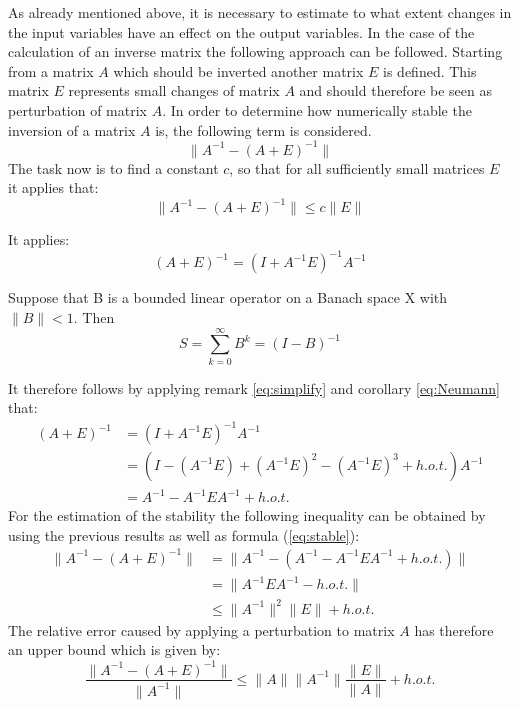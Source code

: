 As already mentioned above, it is necessary to estimate to what extent changes in the input variables have an effect on the output variables. In the case of the calculation of an inverse matrix the following approach can be followed. Starting from a matrix $A$ which should be inverted another matrix $E$ is defined. This matrix $E$ represents small changes of matrix $A$ and should therefore be seen as perturbation of matrix $A$. In order to determine how numerically stable the inversion of a matrix $A$ is, the following term is considered.
\begin{equation}\label{eq:stable}
	\lVert A^{-1} - (A + E)^{-1} \rVert
\end{equation}
The task now is to find a constant $c$, so that for all sufficiently small matrices $E$ it applies that:
\begin{equation}
	\lVert A^{-1} - (A + E)^{-1} \rVert \leq c \lVert E \rVert
\end{equation}
 
\begin{remark}\label{eq:simplify}
	It applies:
	\begin{equation*}
		(A + E)^{-1} = (I + A^{-1}E)^{-1}A^{-1}
	\end{equation*}
\end{remark}

\begin{corollary}\label{eq:Neumann}
	Suppose that B is a bounded linear operator on a Banach space X with $\lVert B \rVert < 1$. Then	
	\begin{equation}
		S = \sum_{k=0}^\infty B^k = (I-B)^{-1}
	\end{equation}  
\end{corollary}
It therefore follows by applying remark \ref{eq:simplify} and corollary \ref{eq:Neumann} that:
\begin{align*}
	(A + E)^{-1} 	&= (I + A^{-1}E)^{-1}A^{-1} \\
					&= (I - (A^{-1}E) + (A^{-1}E)^2 - (A^{-1}E)^3 + h.o.t.) A^{-1} \\
					&= A^{-1} - A^{-1} E A^{-1} + h.o.t.
\end{align*}
 For the estimation of the stability the following inequality can be obtained by using the previous results as well as formula (\ref{eq:stable}):
\begin{align*}
	\lVert A^{-1} - (A + E)^{-1} \rVert & = \lVert A^{-1} - (A^{-1} - A^{-1}EA^{-1} + h.o.t.) \rVert \\
		& = \lVert A^{-1}EA^{-1} - h.o.t. \rVert \\
		& \leq \lVert A^{-1} \rVert^2 \lVert E \rVert +  h.o.t.
\end{align*}
The relative error caused by applying a perturbation to matrix $A$ has therefore an upper bound which is given by: 
\begin{equation}\label{eq:upper_bound}
 \frac{\lVert A^{-1} - (A + E)^{-1} \rVert}{\lVert A^{-1}\rVert} \leq \lVert A \rVert \lVert A^{-1} \rVert \frac{\lVert E \rVert}{\lVert A \rVert} + h.o.t.
\end{equation}


